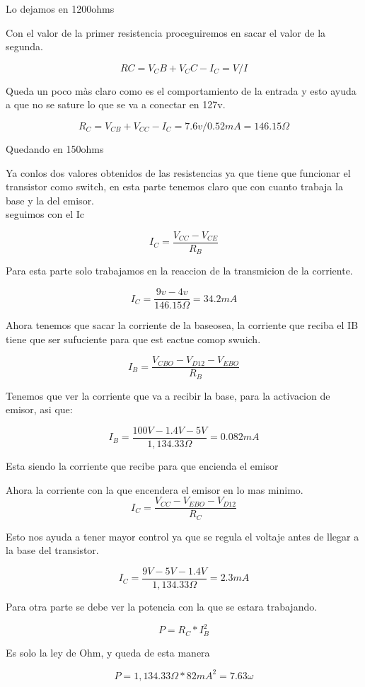 \documentclass[11pt]{article}
\begin{document}
Lo dejamos en 1200ohms

Con el valor de la primer resistencia proceguiremos en sacar el valor de la segunda.


$$ RC=V_CB+V_CC-I_C=V/I $$

Queda un poco màs claro como es el comportamiento de la entrada y esto ayuda a que no se sature lo que se va a conectar en 127v.

$$ R_{C}=V_{CB}+V_{CC}-I_{C}=7.6v/0.52mA= 146.15\Omega $$

Quedando en 150ohms

Ya conlos dos valores obtenidos de las resistencias ya que tiene que funcionar el transistor como switch, en esta parte tenemos claro que con cuanto trabaja la base y la del emisor.
\\
seguimos con el Ic 

$$ I_{C}=\frac{V_{CC}-V_{CE}}{R_{B}} $$

Para esta parte solo trabajamos en la reaccion de la transmicion de la corriente.

$$ I_{C}=\frac{9v-4v}{146.15\Omega}= 34.2mA $$


Ahora tenemos que sacar la corriente de la baseosea, la corriente que reciba el IB tiene que ser sufuciente para que est eactue comop swuich.

$$ I_{B}=\frac{V_{CBO}-V_{D12}-V_{EBO}}{R_{B}} $$


Tenemos que ver la corriente que va a recibir la base, para la activacion de emisor, asi que:


$$ I_{B}=\frac{100V-1.4V-5V}{1,134.33\Omega}= 0.082mA $$

Esta siendo la corriente que recibe para que encienda el emisor


Ahora la corriente con la que encendera el emisor en lo mas minimo.
$$ I_{C}=\frac{V_{CC}-V_{EBO}-V_{D12}}{R_{C}} $$

Esto nos ayuda a tener mayor control ya que se regula el voltaje antes de llegar a la base del transistor.


$$ I_{C}=\frac{9V-5V-1.4V}{1,134.33\Omega}= 2.3mA $$

Para otra parte se debe ver la potencia con la que se estara trabajando.

$$ P=R_{C}*I_{B}^{2} $$


Es solo la ley de Ohm, y queda de esta manera


$$ P= 1,134.33\Omega*82mA^{2}= 7.63\omega $$
\end{document}
